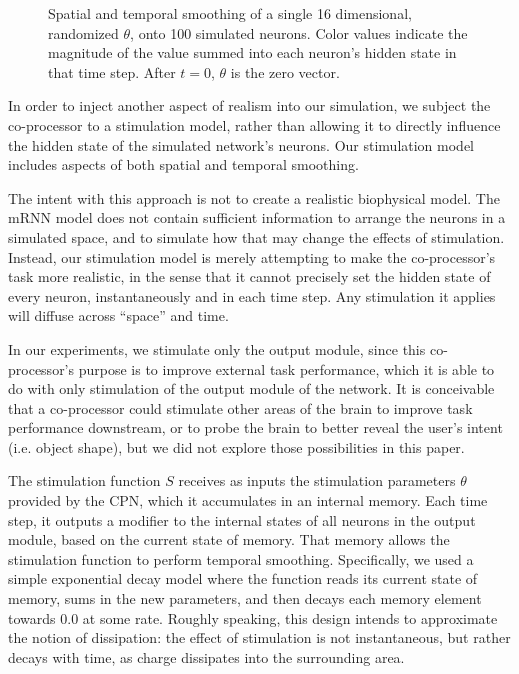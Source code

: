\documentclass[12pt]{iopart}
\begin{document}
\begin{figure}[h]
	\caption{Spatial and temporal smoothing of a single 16 dimensional,
	         randomized $\theta$, onto 100 simulated neurons.
		 Color values indicate the magnitude of the value summed into
		 each neuron's hidden state in that time step. After $t=0$,
		 $\theta$ is the zero vector.}
	\label{fig:stim_single}
\end{figure}

In order to inject another aspect of realism into our simulation, we subject
the co-processor to a stimulation model, rather than allowing it to directly
influence the hidden state of the simulated network's neurons. Our stimulation
model includes aspects of both spatial and temporal smoothing.

The intent with this approach is not to create a realistic biophysical model. The
mRNN model does not contain sufficient information to arrange the neurons in a
simulated space, and to simulate how that may change the effects of stimulation.
Instead, our stimulation model is merely attempting to make the co-processor's task
more realistic, in the sense that it cannot precisely set the hidden state of every
neuron, instantaneously and in each time step. Any stimulation it applies will diffuse
across ``space'' and time.

In our experiments, we stimulate only the output module, since this co-processor's
purpose is to improve external task performance, which it is able to do with
only stimulation of the output module of the network. It is conceivable that
a co-processor could stimulate other areas of the brain to improve task performance
downstream, or to probe the brain to better reveal the user's intent (i.e. object
shape), but we did not explore those possibilities in this paper.

The stimulation function $S$ receives as inputs the stimulation parameters $\theta$
provided by the CPN, which it accumulates in an internal memory. Each time step,
it outputs a modifier to the internal states of all neurons in the output module,
based on the current state of memory. That memory allows
the stimulation function to perform temporal smoothing. Specifically, we used a
simple exponential decay model where the function reads its current state of memory,
sums in the new parameters, and then decays each memory element towards $0.0$ at some
rate. Roughly speaking, this design intends to approximate the notion of dissipation: the
effect of stimulation is not instantaneous, but rather decays with time, as charge
dissipates into the surrounding area.
\end{document}
